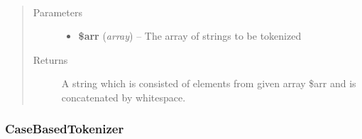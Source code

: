\documentclass[letterpaper,10pt,english]{sphinxmanual}
\begin{document}
\begin{fulllineitems}
\begin{fulllineitems}
\end{fulllineitems}


\begin{fulllineitems}
\label{docs/api:Tokenizer::arrayToString}~\begin{quote}\begin{description}
\item[{Parameters}] \leavevmode\begin{itemize}
\item {} 
\textbf{\$arr} (\emph{array}) -- The array of strings to be tokenized

\end{itemize}

\item[{Returns}] \leavevmode
A string which is consisted of elements from given array \$arr and is concatenated by whitespace.

\end{description}\end{quote}

\end{fulllineitems}


\end{fulllineitems}



\subsubsection{CaseBasedTokenizer}
\label{docs/api:casebasedtokenizer}
\end{document}
